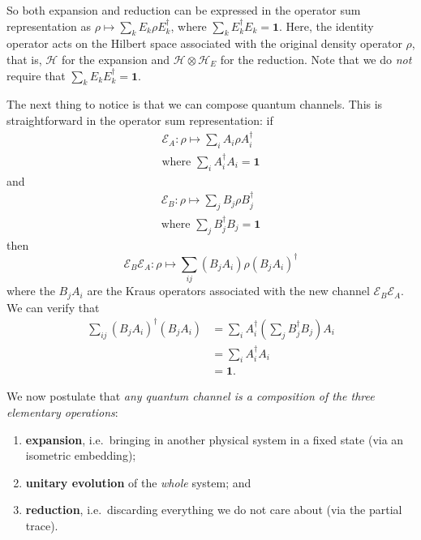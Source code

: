 \documentclass[fleqn]{article}
\providecommand{\tightlist}{%
  \setlength{\itemsep}{0pt}\setlength{\parskip}{0pt}}
\newenvironment{idea}{\noindent}{\medskip}
\begin{document}
So both expansion and reduction can be expressed in the operator sum representation as \(\rho\mapsto\sum_k E_k\rho E_k^\dagger\), where \(\sum_k E_k^\dagger E_k=\mathbf{1}\).
Here, the identity operator acts on the Hilbert space associated with the original density operator \(\rho\), that is, \(\mathcal{H}\) for the expansion and \(\mathcal{H}\otimes\mathcal{H}_E\) for the reduction.
Note that we do \emph{not} require that \(\sum_k E_k E^\dagger_k =\mathbf{1}\).

The next thing to notice is that we can compose quantum channels.
This is straightforward in the operator sum representation: if
\[
  \begin{gathered}
    \mathcal{E}_A\colon \rho
    \longmapsto\sum_i A_i\rho A^\dagger_i
  \\\text{where $\sum_i A^\dagger_i A_i=\mathbf{1}$}
  \end{gathered}
\]
and
\[
  \begin{gathered}
    \mathcal{E}_B\colon \rho
    \longmapsto\sum_j B_j\rho B^\dagger_j
  \\\text{where $\sum_j B^\dagger_j B_j=\mathbf{1}$}
  \end{gathered}
\]
then
\[
  \mathcal{E}_B\mathcal{E}_A\colon \rho
  \longmapsto \sum_{ij} (B_jA_i) \rho (B_jA_i)^\dagger
\]
where the \(B_jA_i\) are the Kraus operators associated with the new channel \(\mathcal{E}_B\mathcal{E}_A\).
We can verify that
\[
  \begin{aligned}
    \sum_{ij} (B_jA_i)^\dagger (B_jA_i)
    &= \sum_i A_i^\dagger\left(\sum_j B_j^\dagger B_j\right)A_i
  \\&= \sum_i A_i^\dagger A_i
  \\&= \mathbf{1}.
  \end{aligned}
\]

\begin{idea}

We now postulate that \emph{any quantum channel is a composition of the three elementary operations}:

\begin{enumerate}
\def\labelenumi{\arabic{enumi}.}
\tightlist
\item
  \textbf{expansion}, i.e.~bringing in another physical system in a fixed state (via an isometric embedding);
\item
  \textbf{unitary evolution} of the \emph{whole} system; and
\item
  \textbf{reduction}, i.e.~discarding everything we do not care about (via the partial trace).
\end{enumerate}

\end{idea}
\end{document}
